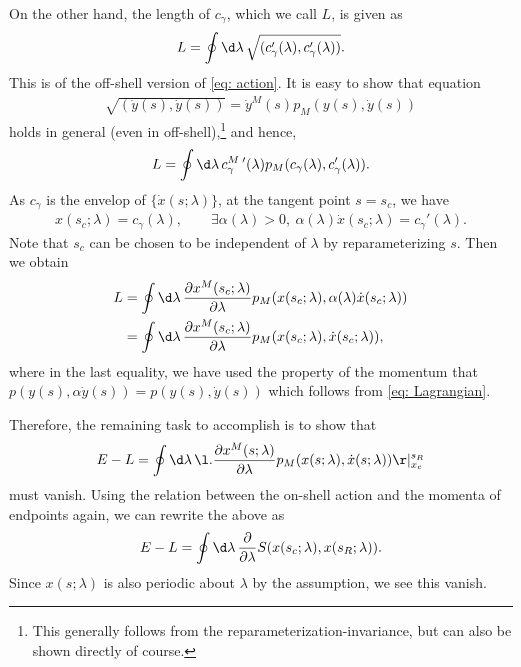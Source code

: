 \documentclass[12pt]{article}
\begin{document}
On the other hand, the length of $c_\gamma$, which we call $L$, is given as
\begin{align}
	L = 	\oint \d \lambda\,\sqrt{(c_\gamma'(\lambda),c_\gamma'(\lambda))}.
\end{align}
This is of the off-shell version of \eqref{eq: action}.
It is easy to show that equation
\begin{align}
	\sqrt{(\dot y(s),\dot y(s))} = \dot y^M(s) p_M(y(s),\dot y(s))\label{eq: Lagrangian}
\end{align}
holds in general (even in off-shell),\footnote{
This generally follows from the reparameterization-invariance, but can also be shown directly of course.
}
and hence,
\begin{align}
	L = \oint\d\lambda\, c_\gamma^M\,'(\lambda) p_M(c_\gamma(\lambda),c_\gamma'(\lambda)). 	
\end{align}
As $c_\gamma$ is the envelop of $\{\dot x(s;\lambda)\}$, at the tangent point $s = s_c$, we have
\begin{align}
	x(s_c;\lambda) = c_\gamma(\lambda),\qquad
	\exists\alpha(\lambda) > 0,~ \alpha(\lambda)\dot x(s_c;\lambda) = c_\gamma'(\lambda).
\end{align}
Note that $s_c$ can be chosen to be independent of $\lambda$ by reparameterizing $s$.
Then we obtain
\begin{align}
	L &= \oint\d\lambda\,\frac{\partial x^M(s_c;\lambda)}{\partial \lambda}p_M(x(s_c;\lambda),\alpha(\lambda)\dot x(s_c;\lambda))\nonumber\\
	&=
	\oint\d\lambda\,\frac{\partial x^M(s_c;\lambda)}{\partial \lambda}p_M(x(s_c;\lambda),\dot x(s_c;\lambda)),
\end{align}
where in the last equality, we have used the property of the momentum that $p(y(s),\alpha \dot y(s)) = p(y(s),\dot y(s))$ which follows from \eqref{eq: Lagrangian}.

Therefore, the remaining task to accomplish is to show that
\begin{align}
	 E - L = \oint\d\lambda\,\l.\frac{\partial x^M(s;\lambda)}{\partial \lambda}p_M(x(s;\lambda),\dot x(s;\lambda))\r|^{s_R}_{x_c}
\end{align}
must vanish.
Using the relation between the on-shell action and the momenta of endpoints again, we can rewrite the above as
\begin{align}
	E - L = \oint\d\lambda\,\frac{\partial}{\partial \lambda}S(x(s_c;\lambda),x(s_R;\lambda)).
\end{align}
Since $x(s;\lambda)$ is also periodic about $\lambda$ by the assumption, we see this vanish.




















 

\end{document}
